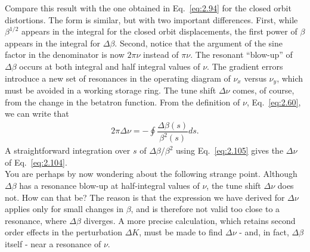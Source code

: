 Compare this result with the one obtained in Eq.~\eqref{eq:2.94} for the closed orbit distortions. The form is similar, but with two important differences.  First, while $\beta^{1/2}$ appears in the integral for the closed orbit displacements, the first power of $\beta$ appears in the integral for $\Delta\beta$. Second, notice that the argument of the sine factor in the denominator is now $2\pi\nu$ instead of $\pi\nu$. The resonant “blow-up” of $\Delta\beta$ occurs at both integral and half integral values of $\nu$. The gradient errors introduce
 a new set of resonances in the operating diagram of $\nu_x$ versus $\nu_y$, which must be avoided in a working storage ring.
The tune shift $\Delta\nu$ comes, of course, from the change in the betatron function. From the definition of $\nu$, Eq.~\eqref{eq:2.60}, we can write that
\begin{align}
	2\pi\Delta\nu = -\oint \dfrac{\Delta\beta(s)}{\beta^2(s)}ds.
\end{align}
A straightforward integration over $s$ of $\Delta\beta/\beta^2$ using Eq.~\eqref{eq:2.105} gives the $\Delta\nu$ of Eq.~\eqref{eq:2.104}.\\
You are perhaps by now wondering about the following strange point. Although $\Delta\beta$ has a resonance blow-up at half-integral values of $\nu$, the tune shift $\Delta\nu$ does not. How can that be? The reason is that the expression we have derived for $\Delta\nu$ applies only for small changes in $\beta$, and is therefore not valid too close to a resonance, where $\Delta\beta$ diverges. A more precise calculation, which retains second order effects in the perturbation $\Delta K$, must be made to find $\Delta\nu$ - and, in fact, $\Delta\beta$ itself - near a resonance of $\nu$.
